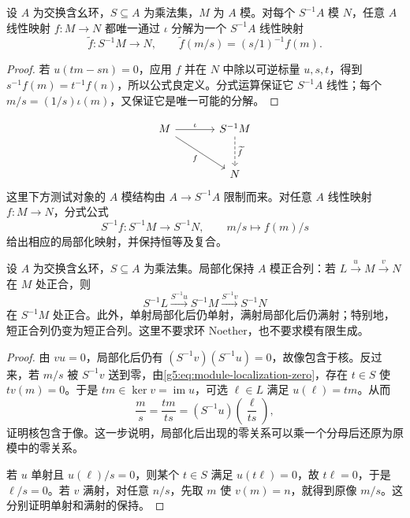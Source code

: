\begin{proposition}\label{g5:prop:module-localization-universal}
	设 \(A\) 为交换含幺环，\(S\subseteq A\) 为乘法集，\(M\) 为 \(A\) 模。对每个 \(S^{-1}A\) 模 \(N\)，任意 \(A\) 线性映射 \(f:M\rightarrow N\) 都唯一通过 \(\iota\) 分解为一个 \(S^{-1}A\) 线性映射
	\[
		\widetilde f:S^{-1}M\longrightarrow N,\qquad
		\widetilde f(m/s)=(s/1)^{-1}f(m).
	\]
\end{proposition}
\begin{proof}
	若 \(u(tm-sn)=0\)，应用 \(f\) 并在 \(N\) 中除以可逆标量 \(u,s,t\)，得到 \(s^{-1}f(m)=t^{-1}f(n)\)，所以公式良定义。分式运算保证它 \(S^{-1}A\) 线性；每个 \(m/s=(1/s)\iota(m)\)，又保证它是唯一可能的分解。
\end{proof}
\[
	\begin{tikzcd}[column sep=large,row sep=large]
		M\arrow[r,"\iota"]\arrow[dr,"f"']&
		S^{-1}M\arrow[d,dashed,"\widetilde f"]\\
		&N
	\end{tikzcd}
\]
这里下方测试对象的 \(A\) 模结构由 \(A\rightarrow S^{-1}A\) 限制而来。对任意 \(A\) 线性映射 \(f:M\rightarrow N\)，分式公式
\[
	S^{-1}f:S^{-1}M\longrightarrow S^{-1}N,\qquad
	m/s\longmapsto f(m)/s
\]
给出相应的局部化映射，并保持恒等及复合。

\begin{theorem}\label{g5:thm:localization-exact}
	设 \(A\) 为交换含幺环，\(S\subseteq A\) 为乘法集。局部化保持 \(A\) 模正合列：若 \(L\xrightarrow{u}M\xrightarrow{v}N\) 在 \(M\) 处正合，则
	\[
		S^{-1}L\xrightarrow{S^{-1}u}S^{-1}M
		\xrightarrow{S^{-1}v}S^{-1}N
	\]
	在 \(S^{-1}M\) 处正合。此外，单射局部化后仍单射，满射局部化后仍满射；特别地，短正合列仍变为短正合列。这里不要求环 Noether，也不要求模有限生成。
\end{theorem}
\begin{proof}
	由 \(vu=0\)，局部化后仍有 \((S^{-1}v)(S^{-1}u)=0\)，故像包含于核。反过来，若 \(m/s\) 被 \(S^{-1}v\) 送到零，由\eqref{g5:eq:module-localization-zero}，存在 \(t\in S\) 使 \(tv(m)=0\)。于是 \(tm\in\ker v=\operatorname{im}u\)，可选 \(\ell\in L\) 满足 \(u(\ell)=tm\)。从而
	\[
		\frac ms=\frac{tm}{ts}
		=(S^{-1}u)\left(\frac{\ell}{ts}\right),
	\]
	证明核包含于像。这一步说明，局部化后出现的零关系可以乘一个分母后还原为原模中的零关系。

	若 \(u\) 单射且 \(u(\ell)/s=0\)，则某个 \(t\in S\) 满足 \(u(t\ell)=0\)，故 \(t\ell=0\)，于是 \(\ell/s=0\)。若 \(v\) 满射，对任意 \(n/s\)，先取 \(m\) 使 \(v(m)=n\)，就得到原像 \(m/s\)。这分别证明单射和满射的保持。
\end{proof}

